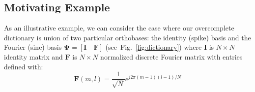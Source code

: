 \documentclass[journal]{IEEEtran}
\begin{document}
\subsection{Motivating Example}

As an illustrative example, we can consider the case where our overcomplete dictionary is union of two particular orthobases: the identity (spike) basis and the Fourier (sine) basis $\boldsymbol{\Psi} = [\boldsymbol{I}\quad \boldsymbol{F}]$ (see~Fig.~\ref{fig:dictionary}) where $\boldsymbol{I}$ is $N\times N$ identity matrix and $\boldsymbol{F}$ is $N\times N$ normalized discrete Fourier matrix with entries defined with:
%
\begin{equation} \label{eq:fourier}
\boldsymbol{F}(m,l)=\frac{1}{\sqrt{N}} e^{j2\pi(m-1)(l-1)/N}
\end{equation}
\end{document}

